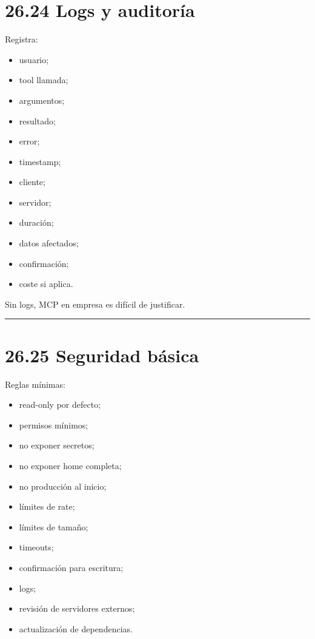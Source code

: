 \section{26.24 Logs y auditoría}\label{logs-y-auditoruxeda}

Registra:

\begin{itemize}
\tightlist
\item
  usuario;
\item
  tool llamada;
\item
  argumentos;
\item
  resultado;
\item
  error;
\item
  timestamp;
\item
  cliente;
\item
  servidor;
\item
  duración;
\item
  datos afectados;
\item
  confirmación;
\item
  coste si aplica.
\end{itemize}

Sin logs, MCP en empresa es difícil de justificar.

\begin{center}\rule{0.5\linewidth}{0.5pt}\end{center}

\section{26.25 Seguridad básica}\label{seguridad-buxe1sica-1}

Reglas mínimas:

\begin{itemize}
\tightlist
\item
  read-only por defecto;
\item
  permisos mínimos;
\item
  no exponer secretos;
\item
  no exponer home completa;
\item
  no producción al inicio;
\item
  límites de rate;
\item
  límites de tamaño;
\item
  timeouts;
\item
  confirmación para escritura;
\item
  logs;
\item
  revisión de servidores externos;
\item
  actualización de dependencias.
\end{itemize}

